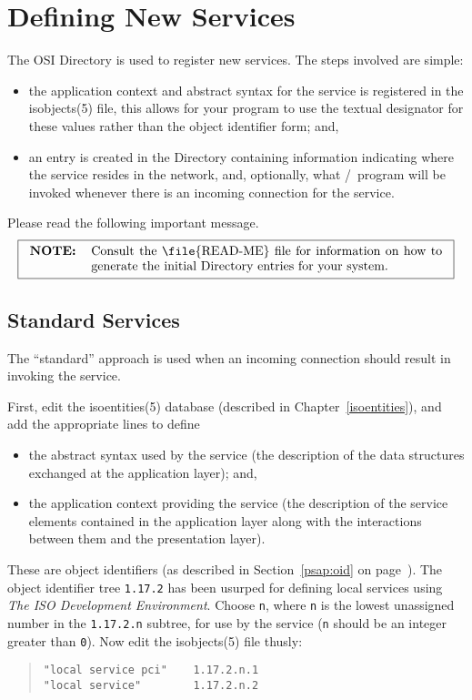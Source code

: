 
\chapter	{Defining New Services}\label{services}
The OSI Directory is used to register new services.
The steps involved are simple:
\begin{itemize}
\item	the application context and abstract syntax for the
	service is registered in the \man isobjects(5) file,
	this allows for your program to use the textual designator for these
	values rather than the object identifier form;
	and,

\item	an entry is created in the Directory containing information indicating
	where the service resides in the network,
	and, optionally,
	what \unix/~program will be invoked whenever there is an incoming
	connection for the service.
\end{itemize}

Please read the following important message.
\[\fbox{\begin{tabular}{lp{0.8\textwidth}}
\bf NOTE:&	Consult the \file{READ-ME} file for information on how
		to generate the initial Directory entries for your system.
\end{tabular}}\]

\section	{Standard Services}\label{service:standard}
The ``standard'' approach is used when an incoming connection should result in
 invoking the service.

First, edit the \man isoentities(5) database
(described in Chapter~\ref{isoentities}),
and add the appropriate lines to define
\begin{itemize}
\item	the abstract syntax used by the service
	(the description of the data structures exchanged at the application
	layer);
	and,

\item	the application context providing the service
	(the description of the service elements contained in the application
	layer along with the interactions between them and the presentation
	layer).
\end{itemize}
These are object identifiers (as described in Section~\ref{psap:oid} on
page~\pageref{psap:oid}).
The object identifier tree \verb"1.17.2" has been usurped for
defining local services using {\em The ISO Development Environment}.
Choose \verb"n",
where \verb"n" is the lowest unassigned number in the \verb"1.17.2.n" subtree,
for use by the service
(\verb"n" should be an integer greater than \verb"0").
Now edit the \man isobjects(5) file thusly:
\begin{quote}\small\begin{verbatim}
"local service pci"    1.17.2.n.1
"local service"        1.17.2.n.2
\end{verbatim}\end{quote}

